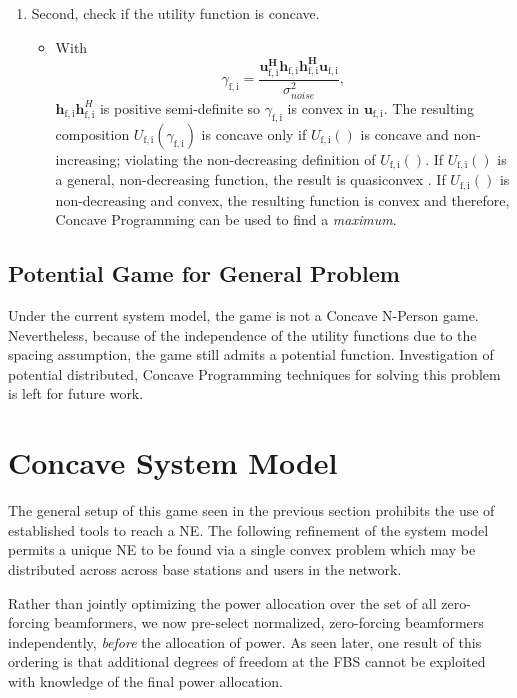 \documentclass[12pt,a4paper]{report}
\begin{document}
\begin{enumerate}
\item Second, check if the utility function is concave.
\begin{itemize}
\item 
With
	\begin{equation*}\label{zf_snr}
	\gamma_{\mathrm{f,i}} = 
	\frac{\mathbf{u^H_{\mathrm{f,i}}h_{\mathrm{f,i}}h^H_{\mathrm{f,i}}u_{\mathrm{f,i}}}}
	{\sigma^2_{noise}  
	},
	\end{equation*}
	 $\mathbf{h}_{\mathrm{f,i}}\mathbf{h}^H_{\mathrm{f,i}}$ is positive semi-definite so $\gamma_{\mathrm{f,i}}$ is convex in ${\mathbf{u}_{\mathrm{f,i}}}$. 
	 The resulting composition $U_{\mathrm{f,i}}(\gamma_{\mathrm{f,i}}) $ is concave only if $U_{\mathrm{f,i}}() $ is concave and non-increasing; violating the non-decreasing definition of $U_{\mathrm{f,i}}() $.
If $U_{\mathrm{f,i}}() $ is a general, non-decreasing function, the result is quasiconvex \cite[p.~102]{BoV:04}. If $U_{\mathrm{f,i}}() $ is  non-decreasing and convex, the resulting
   function is convex and therefore, Concave Programming can be used to find a \emph{maximum}.
\end{itemize}

\end{enumerate}

\subsection{Potential Game for General Problem}
Under the current system model, the game is not a Concave N-Person game. Nevertheless, because of the independence of the utility functions due to the spacing assumption, the game still admits a potential function. Investigation of potential distributed, Concave Programming techniques for solving this problem is left for future work. 

\section{Concave System Model}\label{conmodel}

The general setup of this game seen in the previous section prohibits the use of established tools to reach a NE.
The following refinement of the system model permits a unique NE to be found via a single convex problem which may be distributed across across base stations and users in the network.
\par
Rather than jointly optimizing the power allocation over the set of all zero-forcing beamformers, we now pre-select normalized, zero-forcing beamformers independently, \emph{before} the allocation of power.
As seen later, one result of this ordering is that additional degrees of freedom at the FBS cannot be exploited with knowledge of the final power allocation. 
\end{document}
